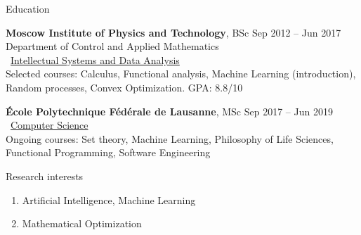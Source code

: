 \documentclass{resume} %
\begin{document}
\begin{rSection}{Education}

{\bf Moscow Institute of Physics and Technology}, BSc \hfill {Sep 2012 -- Jun 2017} \\ 
Department of Control and Applied Mathematics\\ \faExternalLink~\href{http://www.machinelearning.ru/}{Intellectual Systems and Data Analysis}\\
Selected courses: Calculus, Functional analysis, Machine Learning (introduction), Random processes, Convex Optimization.
GPA: 8.8/10

{\bf \'Ecole Polytechnique F\'ed\'erale de Lausanne}, MSc \hfill {Sep 2017 -- Jun 2019} \\ 
\faExternalLink~\href{ic.epfl.ch}{Computer Science}\\
Ongoing courses: Set theory, Machine Learning, Philosophy of Life Sciences, Functional Programming, Software Engineering

\end{rSection}

\begin{rSection}{Research interests}
\begin{enumerate}
\item Artificial Intelligence, Machine Learning
\item Mathematical Optimization
\end{enumerate}
\end{rSection}
\end{document}
